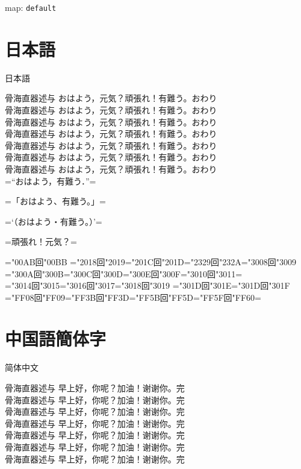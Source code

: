 \documentclass{ujarticle}
\def\map{default}
\begin{document}
\parindent0mm
map: \texttt{\map}

\section{日本語}
\upjpngtb 日本語

\upjpnrml 骨海直器述与 おはよう，元気？頑張れ！有難う。おわり\\
\upjpnrmm 骨海直器述与 おはよう，元気？頑張れ！有難う。おわり\\
\upjpnrmb 骨海直器述与 おはよう，元気？頑張れ！有難う。おわり\\
\upjpngtm 骨海直器述与 おはよう，元気？頑張れ！有難う。おわり\\
\upjpngtb 骨海直器述与 おはよう，元気？頑張れ！有難う。おわり\\
\upjpngte 骨海直器述与 おはよう，元気？頑張れ！有難う。おわり\\
\upjpngth 骨海直器述与 おはよう，元気？頑張れ！有難う。おわり\\

\upjpnrmm
=“おはよう，有難う．”=

=「おはよう、有難う。」=

=‘（おはよう・有難う。）’=

=頑張れ！元気？=

=\kchar"00AB回\kchar"00BB%
=\kchar"2018回\kchar"2019=\kchar"201C回\kchar"201D=\kchar"2329回\kchar"232A=\kchar"3008回\kchar"3009%
=\kchar"300A回\kchar"300B=\kchar"300C回\kchar"300D=\kchar"300E回\kchar"300F=\kchar"3010回\kchar"3011=\\
=\kchar"3014回\kchar"3015=\kchar"3016回\kchar"3017=\kchar"3018回\kchar"3019%
=\kchar"301D回\kchar"301E=\kchar"301D回\kchar"301F%
=\kchar"FF08回\kchar"FF09=\kchar"FF3B回\kchar"FF3D=\kchar"FF5B回\kchar"FF5D=\kchar"FF5F回\kchar"FF60=


\section{中国語簡体字}
\upschgtb 简体中文

\upschrml 骨海直器述与 早上好，你呢？加油！谢谢你。完\\
\upschrmm 骨海直器述与 早上好，你呢？加油！谢谢你。完\\
\upschrmb 骨海直器述与 早上好，你呢？加油！谢谢你。完\\
\upschgtm 骨海直器述与 早上好，你呢？加油！谢谢你。完\\
\upschgtb 骨海直器述与 早上好，你呢？加油！谢谢你。完\\
\upschgte 骨海直器述与 早上好，你呢？加油！谢谢你。完\\
\upschgth 骨海直器述与 早上好，你呢？加油！谢谢你。完\\
\end{document}
